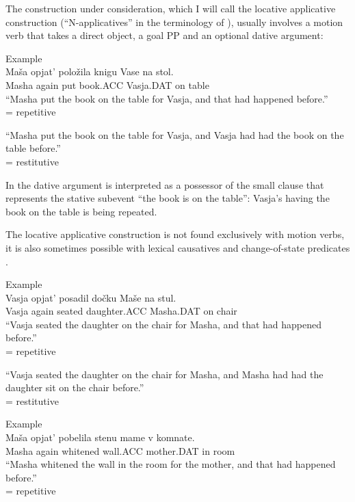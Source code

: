 \documentclass[output=paper,modfonts,nonflat,
 hidelinks
]{langsci/langscibook}
\begin{document}
The construction under consideration, which I will call the locative applicative construction (“N-applicatives” in the terminology of \citep{Pshehotskaya2012}), usually involves a motion verb that takes a direct object, a goal PP and an optional dative argument:


 \ea\label{ex:bondarenko:}
{Example}\\

\gll Maša opjat’ položila knigu Vase na stol.\\
     Masha again put book.ACC Vasja.DAT on table\\
\ea “Masha put the book on the table for Vasja, and that had   happened before.”\\
= {repetitive}

\ex “Masha put the book on the table for Vasja, and Vasja had had   the book on the table before.”\\
= {restitutive}
\z
\z


In  the dative argument is interpreted as a possessor of the small clause that represents the stative subevent “the book is on the table”: Vasja’s having the book on the table is being repeated.



The locative applicative construction is not found exclusively with motion verbs, it is also sometimes possible with lexical causatives  and change-of-state predicates .


 \ea\label{ex:bondarenko:}
{Example}\\

\gll Vasja opjat’ posadil dočku Maše na stul.\\
     Vasja again seated daughter.ACC Masha.DAT on chair\\
\ea “Vasja seated the daughter on the chair for Masha, and that had   happened before.”\\
= {repetitive}

\ex “Vasja seated the daughter on the chair for Masha, and Masha   had had the daughter sit on the chair before.”\\
= {restitutive}
\z
\z

 \ea\label{ex:bondarenko:}
{Example}\\

\gll Maša opjat’ pobelila stenu mame v komnate.\\
     Masha again whitened wall.ACC mother.DAT in room\\
\ea “Masha whitened the wall in the room for the mother, and that   had happened before.”\\
= {repetitive}
\end{document}
